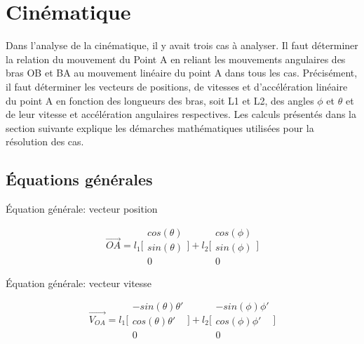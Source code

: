 \documentclass{article}
\begin{document}
\section{Cinématique}
Dans l'analyse de la cinématique, il y avait trois cas à analyser. Il faut déterminer la relation du mouvement du Point A en reliant les mouvements angulaires des bras OB et BA au mouvement linéaire du point A dans tous les cas. Précisément, il faut déterminer les vecteurs de positions, de vitesses et d'accélération linéaire du point A en fonction des longueurs des bras, soit L1 et L2, des angles $\phi$ et $\theta$ et de leur vitesse et accélération angulaires respectives. Les calculs présentés dans la section suivante explique les démarches mathématiques utilisées pour la résolution des cas.

\subsection{Équations générales}
\noindent Équation générale: vecteur position

\begin{equation}
\overrightarrow{OA} = 
    l_1\Bigg[\begin{array}{cc}
    cos(\theta) \\
    sin(\theta) \\
    0
    \end{array}\Bigg]
    +
    l_2\Bigg[\begin{array}{cc}
    cos(\phi) \\
    sin(\phi) \\
    0
    \end{array}\Bigg]
\end{equation}

\noindent Équation générale: vecteur vitesse

\begin{equation}
\overrightarrow{V_{OA}} = 
    l_1\Bigg[\begin{array}{cc}
    -sin(\theta)\theta' \\
    cos(\theta)\theta' \\
    0
    \end{array}\Bigg]
    +
    l_2\Bigg[\begin{array}{cc}
    -sin(\phi)\phi' \\
    cos(\phi)\phi' \\
    0
    \end{array}\Bigg]
\end{equation}
\end{document}
